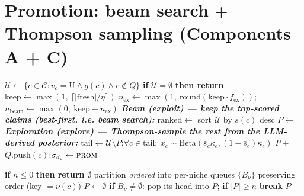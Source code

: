 \documentclass[11pt]{article}
\newcommand{\Claims}{\mathcal{C}}
\newcommand{\Queue}{Q}
\newcommand{\niche}{\nu}
\newcommand{\score}{s}
\newcommand{\grad}{g}
\begin{document}
\section{Promotion: beam search $+$ Thompson sampling (Components A + C)}

\begin{algorithm}[H]
\caption{\textsc{Promote}(fresh) — beam search $+$ Thompson sampling over the resurfacing pool}\label{alg:promote}
\begin{algorithmic}[1]
\State $\mathcal{U}\gets\{c\in\Claims:v_c=\mathrm{U}\wedge\grad(c)\wedge c\notin\Queue\}$ 
\State \textbf{if} $\mathcal{U}=\emptyset$ \textbf{then return}
\State $\mathrm{keep}\gets\max(1,\ \lceil |\mathrm{fresh}|/\eta\rceil)$ 
\State $n_{\mathrm{ex}}\gets\max(1,\ \mathrm{round}(\mathrm{keep}\cdot f_{\mathrm{ex}}))$;\quad $n_{\mathrm{beam}}\gets\max(0,\ \mathrm{keep}-n_{\mathrm{ex}})$
\Statex \textbf{\emph{Beam (exploit) — keep the top-scored claims (best-first, i.e. beam search):}}
\State $\mathrm{ranked}\gets$ sort $\mathcal{U}$ by $\score(c)$ desc
\State $P\gets$  
\Statex \textbf{\emph{Exploration (explore) — Thompson-sample the rest from the LLM-derived posterior:}}
\State $\mathrm{tail}\gets\mathcal{U}\setminus P$;\quad $\forall c\in\mathrm{tail}:\ x_c\sim\mathrm{Beta}(\bar s_c\kappa_c,(1-\bar s_c)\kappa_c)$ 
\State $P\mathrel{+}=$ 
 \State $\Queue.\mathrm{push}(c)$;\quad $\sigma_{d_c}\gets\textsc{prom}$ \EndFor
\end{algorithmic}
\end{algorithm}

\begin{algorithm}[H]
\caption{\textsc{NicheSpread}(ordered$,n$) — round-robin one per niche (MAP-Elites diversity)}\label{alg:niche}
\begin{algorithmic}[1]
\State \textbf{if} $n\le 0$ \textbf{then return} $\emptyset$
\State partition \emph{ordered} into per-niche queues $\{B_\nu\}$ preserving order (key $=\niche(c)$)
\State $P\gets\emptyset$
      \State \textbf{if} $B_\nu\neq\emptyset$: pop its head into $P$; \textbf{if} $|P|\ge n$ \textbf{break}
   \EndFor
\EndWhile
\State \Return $P$
\end{algorithmic}
\end{algorithm}
\end{document}
